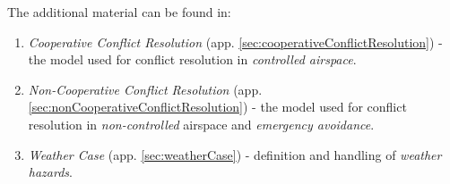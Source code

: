 \noindent The additional material can be found in:
\begin{enumerate}
	\item \emph{Cooperative Conflict Resolution} (app. \ref{sec:cooperativeConflictResolution}) - the model used for conflict resolution in \emph{controlled airspace}.
    
    \item \emph{Non-Cooperative Conflict Resolution} (app. \ref{sec:nonCooperativeConflictResolution})  - the model used for conflict resolution in \emph{non-controlled} airspace and \emph{emergency avoidance}.
    
    \item \emph{Weather Case} (app. \ref{sec:weatherCase}) - definition and handling of \emph{weather hazards}.
\end{enumerate}